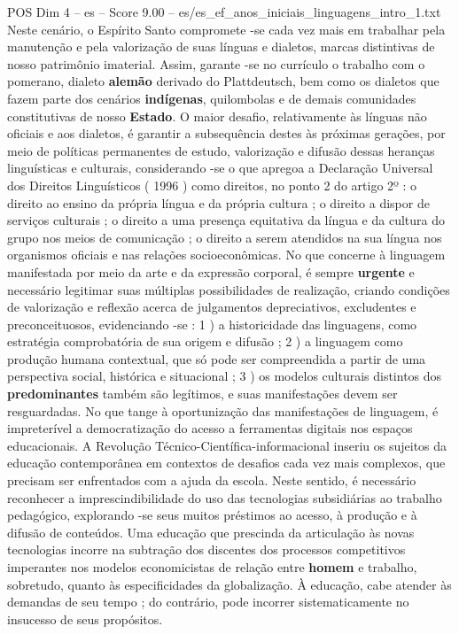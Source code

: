 \begin{textsample}{POS Dim 4 – es – Score 9.00 – es/es\_ef\_anos\_iniciais\_linguagens\_intro\_1.txt}
Neste cenário, o Espírito Santo compromete -se cada vez mais em trabalhar pela manutenção e pela valorização de suas línguas e dialetos, marcas distintivas de nosso patrimônio imaterial.
Assim, garante -se no currículo o trabalho com o pomerano, dialeto \textbf{alemão} derivado do Plattdeutsch, bem como os dialetos que fazem parte dos cenários \textbf{indígenas}, quilombolas e de demais comunidades constitutivas de nosso \textbf{Estado}.
O maior desafio, relativamente às línguas não oficiais e aos dialetos, é garantir a subsequência destes às próximas gerações, por meio de políticas permanentes de estudo, valorização e difusão dessas heranças linguísticas e culturais, considerando -se o que apregoa a Declaração Universal dos Direitos Linguísticos ( 1996 ) como direitos, no ponto 2 do artigo 2º : o direito ao ensino da própria língua e da própria cultura ; o direito a dispor de serviços culturais ; o direito a uma presença equitativa da língua e da cultura do grupo nos meios de comunicação ; o direito a serem atendidos na sua língua nos organismos oficiais e nas relações socioeconômicas.
No que concerne à linguagem manifestada por meio da arte e da expressão corporal, é sempre \textbf{urgente} e necessário legitimar suas múltiplas possibilidades de realização, criando condições de valorização e reflexão acerca de julgamentos depreciativos, excludentes e preconceituosos, evidenciando -se : 1 ) a historicidade das linguagens, como estratégia comprobatória de sua origem e difusão ; 2 ) a linguagem como produção humana contextual, que só pode ser compreendida a partir de uma perspectiva social, histórica e situacional ; 3 ) os modelos culturais distintos dos \textbf{predominantes} também são legítimos, e suas manifestações devem ser resguardadas.
No que tange à oportunização das manifestações de linguagem, é impreterível a democratização do acesso a ferramentas digitais nos espaços educacionais.
A Revolução Técnico-Científica-informacional inseriu os sujeitos da educação contemporânea em contextos de desafios cada vez mais complexos, que precisam ser enfrentados com a ajuda da escola.
Neste sentido, é necessário reconhecer a imprescindibilidade do uso das tecnologias subsidiárias ao trabalho pedagógico, explorando -se seus muitos préstimos ao acesso, à produção e à difusão de conteúdos.
Uma educação que prescinda da articulação às novas tecnologias incorre na subtração dos discentes dos processos competitivos imperantes nos modelos economicistas de relação entre \textbf{homem} e trabalho, sobretudo, quanto às especificidades da globalização.
À educação, cabe atender às demandas de seu tempo ; do contrário, pode incorrer sistematicamente no insucesso de seus propósitos.

\end{textsample}
